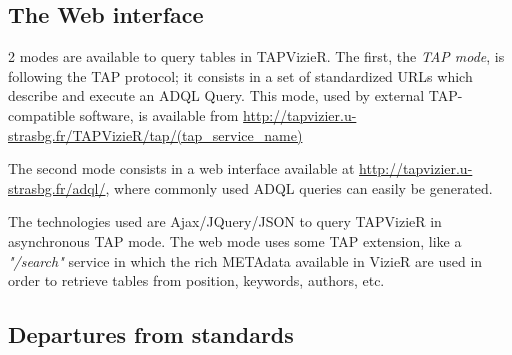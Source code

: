 \documentclass[11pt]{article}
\begin{document}
\subsection{The Web interface}
\label{P044:web_interface}
2 modes are available to query tables in TAPVizieR.
The first, the {\em TAP mode}, is
following the TAP protocol; it consists in a set of standardized URLs
which
describe and execute an ADQL Query. This mode, used by external TAP-compatible
software, is available from
{\small\url{http://tapvizier.u-strasbg.fr/TAPVizieR/tap/(tap_service_name)}}

The second mode consists in a web interface %
available at {\small\url{http://tapvizier.u-strasbg.fr/adql/}}, where
commonly used ADQL queries can easily be generated.

The technologies used are Ajax/JQuery/JSON to query TAPVizieR in asynchronous 
TAP mode. The web mode uses some TAP extension, like a \textit{"/search"} service
in which the rich METAdata available in VizieR are used in order to retrieve tables 
from position, keywords, authors, etc.






\subsection{Departures from standards}
\end{document}
